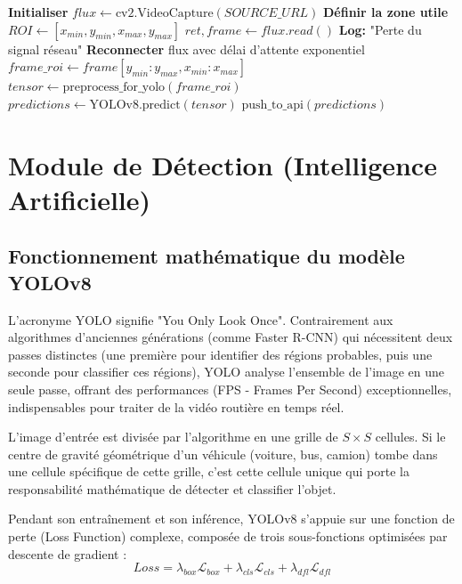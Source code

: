 \begin{algorithm}[H]
\caption{Algorithme de prétraitement et d'application dynamique de la ROI}
\begin{algorithmic}[1]
\STATE \textbf{Initialiser} $flux \leftarrow \text{cv2.VideoCapture}(SOURCE\_URL)$
\STATE \textbf{Définir la zone utile} $ROI \leftarrow [x_{min}, y_{min}, x_{max}, y_{max}]$
    \STATE $ret, frame \leftarrow flux.read()$
        \STATE \textbf{Log:} "Perte du signal réseau"
        \STATE \textbf{Reconnecter} flux avec délai d'attente exponentiel
    \ENDIF
    \STATE {}
    \STATE $frame\_roi \leftarrow frame[y_{min}:y_{max}, x_{min}:x_{max}]$
    \STATE $tensor \leftarrow \text{preprocess\_for\_yolo}(frame\_roi)$ 
    \STATE $predictions \leftarrow \text{YOLOv8.predict}(tensor)$
    \STATE $\text{push\_to\_api}(predictions)$ 
\ENDWHILE
\end{algorithmic}
\end{algorithm}

\section{Module de Détection (Intelligence Artificielle)}

\subsection{Fonctionnement mathématique du modèle YOLOv8}
L'acronyme YOLO signifie "You Only Look Once". Contrairement aux algorithmes d'anciennes générations (comme Faster R-CNN) qui nécessitent deux passes distinctes (une première pour identifier des régions probables, puis une seconde pour classifier ces régions), YOLO analyse l'ensemble de l'image en une seule passe, offrant des performances (FPS - Frames Per Second) exceptionnelles, indispensables pour traiter de la vidéo routière en temps réel.

L'image d'entrée est divisée par l'algorithme en une grille de $S \times S$ cellules. Si le centre de gravité géométrique d'un véhicule (voiture, bus, camion) tombe dans une cellule spécifique de cette grille, c'est cette cellule unique qui porte la responsabilité mathématique de détecter et classifier l'objet. 

Pendant son entraînement et son inférence, YOLOv8 s'appuie sur une fonction de perte (Loss Function) complexe, composée de trois sous-fonctions optimisées par descente de gradient :
\begin{equation}
Loss = \lambda_{box} \mathcal{L}_{box} + \lambda_{cls} \mathcal{L}_{cls} + \lambda_{dfl} \mathcal{L}_{dfl}
\end{equation}

